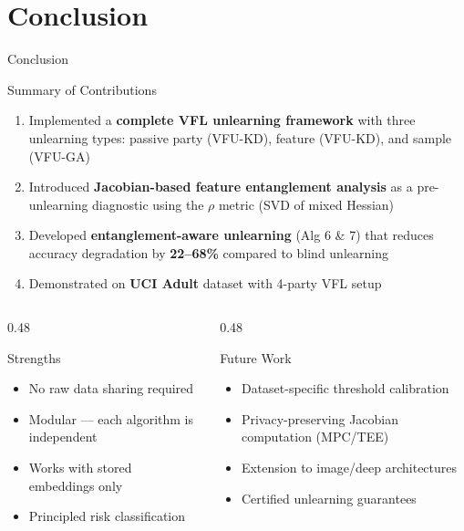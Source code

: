 \documentclass[aspectratio=169, 11pt]{beamer}
\begin{document}
\section{Conclusion}

\begin{frame}{Conclusion}
  \begin{block}{Summary of Contributions}
    \begin{enumerate}
      \item Implemented a \textbf{complete VFL unlearning framework} with three unlearning types: passive party (VFU-KD), feature (VFU-KD), and sample (VFU-GA)
      \item Introduced \textbf{Jacobian-based feature entanglement analysis} as a pre-unlearning diagnostic using the $\rho$ metric (SVD of mixed Hessian)
      \item Developed \textbf{entanglement-aware unlearning} (Alg 6 \& 7) that reduces accuracy degradation by \textbf{22--68\%} compared to blind unlearning
      \item Demonstrated on \textbf{UCI Adult} dataset with 4-party VFL setup
    \end{enumerate}
  \end{block}
  \vspace{0.3cm}
  \begin{columns}[T]
    \begin{column}{0.48\textwidth}
      \begin{exampleblock}{Strengths}
        \footnotesize
        \begin{itemize}
          \item No raw data sharing required
          \item Modular --- each algorithm is independent
          \item Works with stored embeddings only
          \item Principled risk classification
        \end{itemize}
      \end{exampleblock}
    \end{column}
    \begin{column}{0.48\textwidth}
      \begin{alertblock}{Future Work}
        \footnotesize
        \begin{itemize}
          \item Dataset-specific threshold calibration
          \item Privacy-preserving Jacobian computation (MPC/TEE)
          \item Extension to image/deep architectures
          \item Certified unlearning guarantees
        \end{itemize}
      \end{alertblock}
    \end{column}
  \end{columns}
\end{frame}
\end{document}

